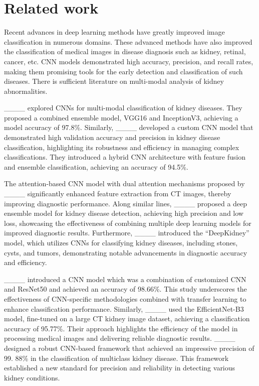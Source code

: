 \section{Related work}
Recent advances in deep learning methods have greatly improved image classification in numerous domains. These advanced methods have also improved the classification of medical images in disease diagnosis such as kidney, retinal, cancer, etc.  CNN models demonstrated high accuracy, precision, and recall rates, making them promising tools for the early detection and classification of such diseases. There is sufficient literature on multi-modal analysis of kidney abnormalities.

____ explored CNNs for multi-modal classification of kidney diseases. They proposed a combined ensemble model, VGG16 and InceptionV3, achieving a model accuracy of 97.8\%. Similarly, ____ developed a custom CNN model that demonstrated high validation accuracy and precision in kidney disease classification, highlighting its robustness and efficiency in managing complex classifications. They introduced a hybrid CNN architecture with feature fusion and ensemble classification, achieving an accuracy of 94.5\%.

The attention-based CNN model with dual attention mechanisms proposed by ____ significantly enhanced feature extraction from CT images, thereby improving diagnostic performance. Along similar lines, ____ proposed a deep ensemble model for kidney disease detection, achieving high precision and low loss, showcasing the effectiveness of combining multiple deep learning models for improved diagnostic results. Furthermore, ____ introduced the ``DeepKidney'' model, which utilizes CNNs for classifying kidney diseases, including stones, cysts, and tumors, demonstrating notable advancements in diagnostic accuracy and efficiency.

____ introduced a CNN model which was a combination of customized CNN and ResNet50 and achieved an accuracy of 98.66\%. This study underscores the effectiveness of CNN-specific methodologies combined with transfer learning to enhance classification performance. Similarly, ____ used the EfficientNet-B3 model, fine-tuned on a large CT kidney image dataset, achieving a classification accuracy of 95.77\%. Their approach highlights the efficiency of the model in processing medical images and delivering reliable diagnostic results. ____ designed a robust CNN-based framework that achieved an impressive precision of 99. 88\% in the classification of multiclass kidney disease. This framework established a new standard for precision and reliability in detecting various kidney conditions.

